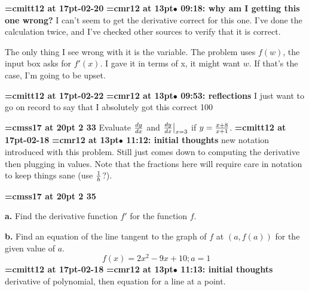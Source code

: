 {\medskip\noindent\bf\font\titlefont=cmitt12 at 17pt-02-20}\medskip
{\smallskip\noindent\bf\font\titlefont=cmr12 at 13pt\titlefont $\bullet$ 09:18: why am I getting this one wrong?}\smallskip
I can't seem to get the derivative correct for this one. I've done the calculation twice, and I've checked other sources to verify that it is correct.
\par

The only thing I see wrong with it is the variable. The problem uses $f(w)$, the input box asks for $f'(x)$. I gave it in terms of x, it might want $w$. If that's the case, I'm going to be upset.
\par

{\medskip\noindent\bf\font\titlefont=cmitt12 at 17pt-02-22}\medskip
{\smallskip\noindent\bf\font\titlefont=cmr12 at 13pt\titlefont $\bullet$ 09:53: reflections}\smallskip
I just want to go on record to say that I absolutely got this correct 100%
\par

{\medskip\noindent\bf\font\titlefont=cmss17 at 20pt 2 33}\medskip
Evaluate ${dy \over dx}$ and ${dy \over dx}\big|_{x = 3}$
if $y = {x + 8 \over x + 1}$.
{\medskip\noindent\bf\font\titlefont=cmitt12 at 17pt-02-18}\medskip
{\smallskip\noindent\bf\font\titlefont=cmr12 at 13pt\titlefont $\bullet$ 11:12: initial thoughts}\smallskip
new notation introduced with this problem. Still just comes down to computing the derivative then plugging in values. Note that the fractions here will require care in notation to keep things sane (use $1 \over h$?).
\par

{\medskip\noindent\bf\font\titlefont=cmss17 at 20pt 2 35}\medskip
\par {\bf a.} Find the derivative function $f'$ for the
function $f$.
\par {\bf b.} Find an equation of the line tangent to the
graph of $f$ at $(a, f(a))$ for the given value of $a$.
$$\
f(x) = 2x^2 - 9x + 10; a = 1
$$
{\medskip\noindent\bf\font\titlefont=cmitt12 at 17pt-02-18}\medskip
{\smallskip\noindent\bf\font\titlefont=cmr12 at 13pt\titlefont $\bullet$ 11:13: initial thoughts}\smallskip
derivative of polynomial, then equation for a line at a point.
\par


